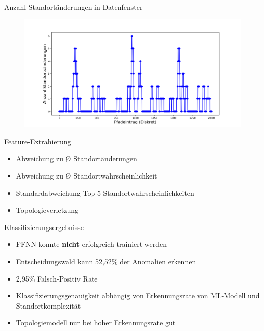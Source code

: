 \documentclass[10pt]{beamer}
\begin{document}
\begin{frame}{Anzahl Standortänderungen in Datenfenster}
    \begin{figure}
        \centering
        \includegraphics[width=\linewidth]{anomaly_detection/location_changes.png}
    \end{figure}
\end{frame}

\begin{frame}{Feature-Extrahierung}
    \begin{itemize}
        \item Abweichung zu Ø Standortänderungen
        \item Abweichung zu Ø Standortwahrscheinlichkeit
        \item Standardabweichung Top 5 Standortwahrscheinlichkeiten
        \item Topologieverletzung
    \end{itemize}
\end{frame}

\begin{frame}{Klassifizierungsergebnisse}
    \begin{itemize}
        \item FFNN konnte \textbf{nicht} erfolgreich trainiert werden
        \item Entscheidungswald kann 52,52\% der Anomalien erkennen
        \item 2,95\% Falsch-Positiv Rate
        \item Klassifizierungsgenauigkeit abhängig von Erkennungsrate von ML-Modell und Standortkomplexität
        \item Topologiemodell nur bei hoher Erkennungsrate gut
    \end{itemize}
\end{frame}
\end{document}
